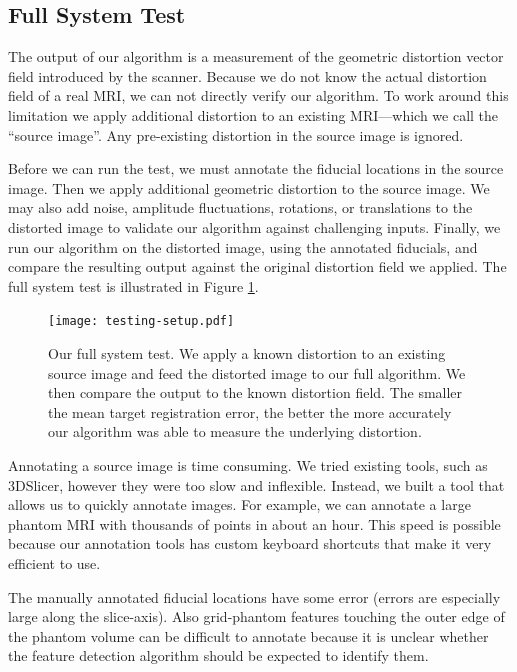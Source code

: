 \documentclass[12pt]{article}
\begin{document}
\subsection{Full System Test}

The output of our algorithm is a measurement of the geometric distortion vector field introduced by the scanner.  Because we do not know the actual distortion field of a real MRI, we can not directly verify our algorithm.  To work around this limitation we apply additional distortion to an existing MRI---which we call the ``source image''.  Any pre-existing distortion in the source image is ignored.

Before we can run the test, we must annotate the fiducial locations in the source image.  Then we apply additional geometric distortion to the source image.  We may also add noise, amplitude fluctuations, rotations, or translations to the distorted image to validate our algorithm against challenging inputs.  Finally, we run our algorithm on the distorted image, using the annotated fiducials, and compare the resulting output against the original distortion field we applied.  The full system test is illustrated in Figure \ref{fig:testing-setup}.

\begin{figure}
    \centering
    \texttt{[image: testing-setup.pdf]}
    \caption{Our full system test.  We apply a known distortion to an existing source image and feed the distorted image to our full algorithm.  We then compare the output to the known distortion field.  The smaller the mean target registration error, the better the more accurately our algorithm was able to measure the underlying distortion.}
    \label{fig:testing-setup}
\end{figure}

Annotating a source image is time consuming.  We tried existing tools, such as 3DSlicer, however they were too slow and inflexible.  Instead, we built a tool that allows us to quickly annotate images.  For example, we can annotate a large phantom MRI with thousands of points in about an hour.  This speed is possible because our annotation tools has custom keyboard shortcuts that make it very efficient to use.

The manually annotated fiducial locations have some error (errors are especially large along the slice-axis).  Also grid-phantom features touching the outer edge of the phantom volume can be difficult to annotate because it is unclear whether the feature detection algorithm should be expected to identify them.
\end{document}
